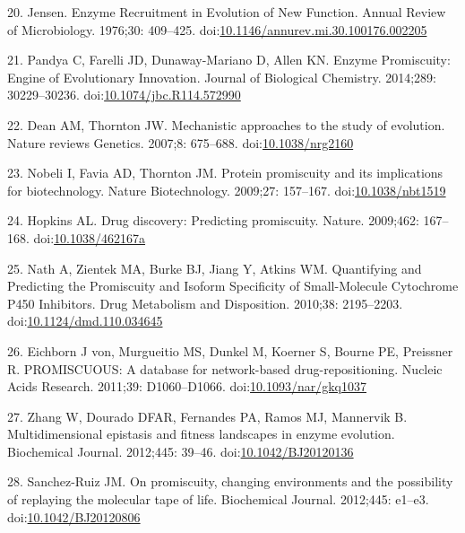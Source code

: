 \documentclass[12pt,twoside]{reedthesis}
\begin{document}
  \hypertarget{ref-jensenux5fenzymeux5f1976}{}
  20. Jensen. Enzyme Recruitment in Evolution of New Function. Annual
  Review of Microbiology. 1976;30: 409--425.
  doi:\href{https://doi.org/10.1146/annurev.mi.30.100176.002205}{10.1146/annurev.mi.30.100176.002205}
  
  \hypertarget{ref-pandyaux5fenzymeux5f2014}{}
  21. Pandya C, Farelli JD, Dunaway-Mariano D, Allen KN. Enzyme
  Promiscuity: Engine of Evolutionary Innovation. Journal of Biological
  Chemistry. 2014;289: 30229--30236.
  doi:\href{https://doi.org/10.1074/jbc.R114.572990}{10.1074/jbc.R114.572990}
  
  \hypertarget{ref-deanux5fmechanisticux5f2007}{}
  22. Dean AM, Thornton JW. Mechanistic approaches to the study of
  evolution. Nature reviews Genetics. 2007;8: 675--688.
  doi:\href{https://doi.org/10.1038/nrg2160}{10.1038/nrg2160}
  
  \hypertarget{ref-nobeliux5fproteinux5f2009}{}
  23. Nobeli I, Favia AD, Thornton JM. Protein promiscuity and its
  implications for biotechnology. Nature Biotechnology. 2009;27: 157--167.
  doi:\href{https://doi.org/10.1038/nbt1519}{10.1038/nbt1519}
  
  \hypertarget{ref-hopkinsux5fdrugux5f2009}{}
  24. Hopkins AL. Drug discovery: Predicting promiscuity. Nature.
  2009;462: 167--168.
  doi:\href{https://doi.org/10.1038/462167a}{10.1038/462167a}
  
  \hypertarget{ref-nathux5fquantifyingux5f2010}{}
  25. Nath A, Zientek MA, Burke BJ, Jiang Y, Atkins WM. Quantifying and
  Predicting the Promiscuity and Isoform Specificity of Small-Molecule
  Cytochrome P450 Inhibitors. Drug Metabolism and Disposition. 2010;38:
  2195--2203.
  doi:\href{https://doi.org/10.1124/dmd.110.034645}{10.1124/dmd.110.034645}
  
  \hypertarget{ref-vonux5feichbornux5fpromiscuous:ux5f2011}{}
  26. Eichborn J von, Murgueitio MS, Dunkel M, Koerner S, Bourne PE,
  Preissner R. PROMISCUOUS: A database for network-based
  drug-repositioning. Nucleic Acids Research. 2011;39: D1060--D1066.
  doi:\href{https://doi.org/10.1093/nar/gkq1037}{10.1093/nar/gkq1037}
  
  \hypertarget{ref-zhangux5fmultidimensionalux5f2012}{}
  27. Zhang W, Dourado DFAR, Fernandes PA, Ramos MJ, Mannervik B.
  Multidimensional epistasis and fitness landscapes in enzyme evolution.
  Biochemical Journal. 2012;445: 39--46.
  doi:\href{https://doi.org/10.1042/BJ20120136}{10.1042/BJ20120136}
  
  \hypertarget{ref-sanchez-ruizux5fpromiscuityux5f2012}{}
  28. Sanchez-Ruiz JM. On promiscuity, changing environments and the
  possibility of replaying the molecular tape of life. Biochemical
  Journal. 2012;445: e1--e3.
  doi:\href{https://doi.org/10.1042/BJ20120806}{10.1042/BJ20120806}
  
\end{document}
